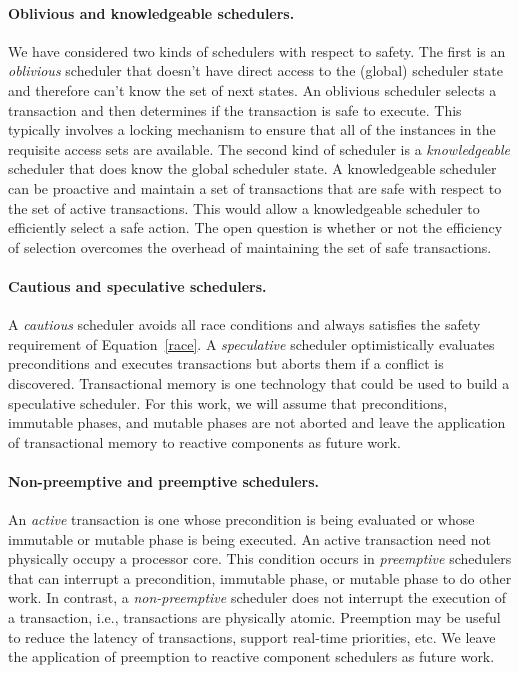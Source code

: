 \paragraph{Oblivious and knowledgeable schedulers.}
We have considered two kinds of schedulers with respect to safety.
The first is an \emph{oblivious} scheduler that doesn't have direct access to the (global) scheduler state and therefore can't know the set of next states.
An oblivious scheduler selects a transaction and then determines if the transaction is safe to execute.
This typically involves a locking mechanism to ensure that all of the instances in the requisite access sets are available.
The second kind of scheduler is a \emph{knowledgeable} scheduler that does know the global scheduler state.
A knowledgeable scheduler can be proactive and maintain a set of transactions that are safe with respect to the set of active transactions.
This would allow a knowledgeable scheduler to efficiently select a safe action.
The open question is whether or not the efficiency of selection overcomes the overhead of maintaining the set of safe transactions.

\paragraph{Cautious and speculative schedulers.}
A \emph{cautious} scheduler avoids all race conditions and always satisfies the safety requirement of Equation~\ref{race}.
A \emph{speculative} scheduler optimistically evaluates preconditions and executes transactions but aborts them if a conflict is discovered.
Transactional memory is one technology that could be used to build a speculative scheduler.
For this work, we will assume that preconditions, immutable phases, and mutable phases are not aborted and leave the application of transactional memory to reactive components as future work.

\paragraph{Non-preemptive and preemptive schedulers.}
An \emph{active} transaction is one whose precondition is being evaluated or whose immutable or mutable phase is being executed.
An active transaction need not physically occupy a processor core.
This condition occurs in \emph{preemptive} schedulers that can interrupt a precondition, immutable phase, or mutable phase to do other work.
In contrast, a \emph{non-preemptive} scheduler does not interrupt the execution of a transaction, i.e., transactions are physically atomic.
Preemption may be useful to reduce the latency of transactions, support real-time priorities, etc.
We leave the application of preemption to reactive component schedulers as future work.

